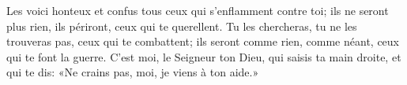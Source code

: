 Les voici honteux et confus tous ceux qui s’enflamment contre toi;
	ils ne seront plus rien, ils périront, ceux qui te querellent.
Tu les chercheras, tu ne les trouveras pas, ceux qui te combattent;
	ils seront comme rien, comme néant, ceux qui te font la guerre.
C’est moi, le Seigneur ton Dieu, qui saisis ta main droite,
	et qui te dis: «Ne crains pas, moi, je viens à ton aide.»
